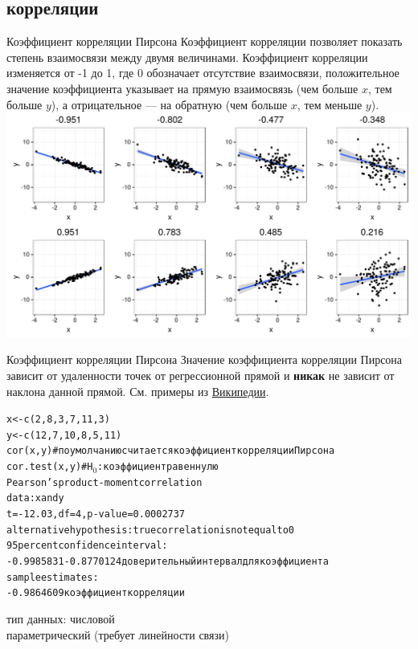 \subsection{корреляции}
\begin{frame}{Коэффициент корреляции Пирсона}
Коэффициент корреляции позволяет показать степень взаимосвязи между двумя величинами. Коэффициент корреляции изменяется от -1 до 1, где 0 обозначает отсутствие взаимосвязи, положительное значение коэффициента указывает на прямую взаимосвязь (чем больше $x$, тем больше $y$), а отрицательное — на обратную (чем больше $x$, тем меньше $y$).\\
\includegraphics[width=0.9\linewidth]{correlation.pdf}\\
\end{frame}
\begin{frame}{Коэффициент корреляции Пирсона}
Значение коэффициента корреляции Пирсона зависит от удаленности точек от регрессионной прямой и \textbf{никак} не зависит от наклона данной прямой. См. примеры из \href{https://upload.wikimedia.org/wikipedia/commons/d/d4/Correlation_examples2.svg}{\alert{Википедии}}.
\scriptsize
\begin{alltt}
x <- c(2, 8, 3, 7, 11, 3)\\
y <- c(12, 7, 10, 8, 5, 11)\\
\alert{cor(x, y) \hfill \# по умолчанию считается коэффициент корреляции Пирсона}\\
\alert{cor.test(x, y) \hfill \# H$_0$: коэффициент равен нулю} \medskip\\
Pearson's product-moment correlation\\
data:  x and y\\
t = -12.03, df = 4, p-value = 0.0002737 \\
alternative hypothesis: true correlation is not equal to 0\\
95 percent confidence interval:\\
 -0.9985831 -0.8770124 \hfill доверительный интервал для коэффициента\\
sample estimates:\\
-0.9864609 \hfill коэффициент корреляции
\end{alltt}
\normalsize
\vfill
тип данных: числовой\\
параметрический (требует линейности связи)\\~
\end{frame}
